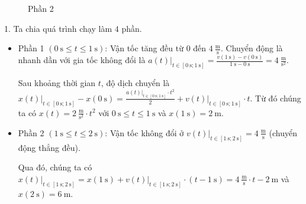 \documentclass[a4paper, titlepage, openany]{book}
\newcounter{solution}
\numberwithin{equation}{chapter}
\begin{document}
\begin{figure}[h]
\begin{minipage}[t]{0.48\textwidth}
      \caption{Phần 2}
      \label{fig:chay_phan_b}
   \end{minipage}
\end{figure}

\solution

1. Ta chia quá trình chạy làm $4$ phần.


\begin{itemize}
   \item Phần 1 $\left(0\ \text{s}\leq t \leq 1\ \text{s}\right)$: Vận tốc tăng đều từ $0$ đến $4\ \frac{\text{m}}{\text{s}}$. Chuyển động là nhanh dần với gia tốc không đổi là $\left.a(t)\right|_{t\in\left[0\ \text{s};1\ \text{s}\right]}=\frac{v(1\ \text{s})-v(0\ \text{s})}{1\ \text{s}-0\ \text{s}}=4\ \frac{\text{m}}{\text{s}^2}$.
   
Sau khoảng thời gian $t$, độ dịch chuyển là $\left.x(t)\right|_{t\in\left[0\ \text{s};1\ \text{s}\right]} - x(0\ \text{s}) = \frac{\left.a(t)\right|_{t\in\left[0\ \text{s};1\ \text{s}\right]}\cdot t^2}{2} + \left.v(t)\right|_{t\in\left[0\ \text{s};1\ \text{s}\right]}\cdot t$. Từ đó chúng ta có $x(t) = 2\ \frac{\text{m}}{\text{s}^2}\cdot t^2$ với $0\ \text{s}\leq t \leq 1\ \text{s}$ và $x(1\ \text{s}) = 2\ \text{m}$.
   
   \item Phần 2 $\left(1\ \text{s}\leq t \leq 2\ \text{s}\right)$: Vận tốc không đổi ở $\left.v(t)\right|_{t\in\left[1\ \text{s};2\ \text{s}\right]} = 4\ \frac{\text{m}}{\text{s}}$ (chuyển động thẳng đều). 
   
Qua đó, chúng ta có $\left.x(t)\right|_{t\in\left[1\ \text{s};2\ \text{s}\right]} = x(1\ \text{s}) + \left.v(t)\right|_{t\in\left[1\ \text{s};2\ \text{s}\right]}\cdot\left(t - 1\ \text{s}\right) = 4\ \frac{\text{m}}{\text{s}}\cdot t - 2\ \text{m}$ và $x(2\ \text{s}) = 6\ \text{m}$.
\end{itemize}
\end{document}
